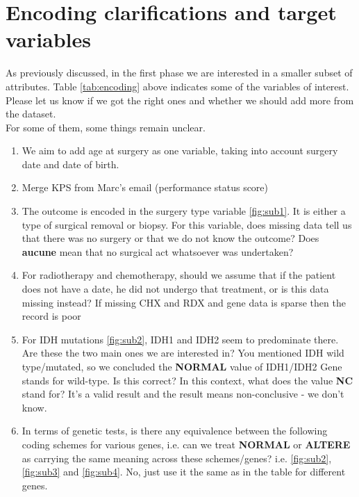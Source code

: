\documentclass[a4paper]{article}
\begin{document}
\section{Encoding clarifications and target variables}
As previously discussed, in the first phase we are interested in a smaller subset of attributes. Table \ref{tab:encoding} above indicates some of the variables of interest. Please let us know if we got the right ones and whether we should add more from the dataset. \\
For some of them, some things remain unclear. \\
\begin{enumerate}
\item We aim to add age at surgery as one variable, taking into account surgery date and date of birth. 
\item Merge KPS from Marc's email (performance status score)
\item The outcome is encoded in the surgery type variable \ref{fig:sub1}. It is either a type of surgical removal or biopsy. For this variable, does missing data tell us that there was no surgery or that we do not know the outcome?
Does \textbf{aucune} mean that no surgical act whatsoever was undertaken?
\item For radiotherapy and chemotherapy, should we assume that if the patient does not have a date, he did not undergo that treatment, or is this data missing instead? If missing CHX and RDX and gene data is sparse then the record is poor
\item For IDH mutations \ref{fig:sub2}, IDH1 and IDH2 seem to predominate there. Are these the two main ones we are interested in? You mentioned IDH wild type/mutated, so we concluded the \textbf{NORMAL} value of IDH1/IDH2 Gene stands for wild-type. Is this correct? In this context, what does the value \textbf{NC} stand for?
It's a valid result and the result means non-conclusive - we don't know. 
\item In terms of genetic tests, is there any equivalence between the following coding schemes for various genes, i.e. can we treat \textbf{NORMAL} or \textbf{ALTERE} as carrying the same meaning across these schemes/genes? i.e. \ref{fig:sub2}, \ref{fig:sub3} and \ref{fig:sub4}. No, just use it the same as in the table for different genes. 
\end{enumerate}
\end{document}
